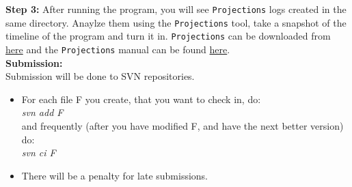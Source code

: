 \documentclass{article}
\begin{document}
\textbf{Step 3:}  After running the program, you will see \texttt{Projections}
logs created in the same directory. Anaylze them using the \texttt{Projections} tool, take a snapshot of the timeline of the program and turn it in. \texttt{Projections} can be
downloaded from \href{http://charm.cs.uiuc.edu/software}{here} and the
\texttt{Projections} manual can
be found
\href{http://charm.cs.illinois.edu/manuals/html/projections/manual-1p.html}
{here}. \\

\textbf{Submission:} \\
Submission will be done to SVN repositories.
\begin{itemize}
\item  For each file F you create, that you want to check in, do: \\
        \textit{svn add F}\\
        and frequently (after you have modified F, and have the next better
        version) do:\\ 
        \textit{svn ci F}
\item  There will be a penalty for late submissions.
\end{itemize}
\end{document}
